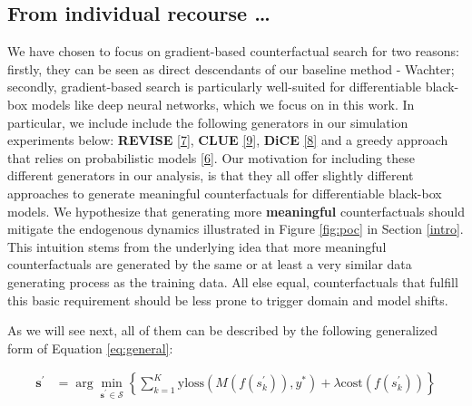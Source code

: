 \documentclass[conference,final,]{IEEEtran}
\theoremstyle{definition}
\theoremstyle{definition}
\theoremstyle{definition}
\theoremstyle{definition}
\theoremstyle{remark}
\begin{document}
\hypertarget{method-general}{%
\subsection{From individual recourse \ldots{}}\label{method-general}}

We have chosen to focus on gradient-based counterfactual search for two reasons: firstly, they can be seen as direct descendants of our baseline method - Wachter; secondly, gradient-based search is particularly well-suited for differentiable black-box models like deep neural networks, which we focus on in this work. In particular, we include include the following generators in our simulation experiments below: \textbf{REVISE} \protect\hyperlink{ref-joshi2019towards}{{[}7{]}}, \textbf{CLUE} \protect\hyperlink{ref-antoran2020getting}{{[}9{]}}, \textbf{DiCE} \protect\hyperlink{ref-mothilal2020explaining}{{[}8{]}} and a greedy approach that relies on probabilistic models \protect\hyperlink{ref-schut2021generating}{{[}6{]}}. Our motivation for including these different generators in our analysis, is that they all offer slightly different approaches to generate meaningful counterfactuals for differentiable black-box models. We hypothesize that generating more \textbf{meaningful} counterfactuals should mitigate the endogenous dynamics illustrated in Figure \ref{fig:poc} in Section \ref{intro}. This intuition stems from the underlying idea that more meaningful counterfactuals are generated by the same or at least a very similar data generating process as the training data. All else equal, counterfactuals that fulfill this basic requirement should be less prone to trigger domain and model shifts.

As we will see next, all of them can be described by the following generalized form of Equation \eqref{eq:general}:

\begin{equation}
\begin{aligned}
\mathbf{s}^\prime &= \arg \min_{\mathbf{s}^\prime \in \mathcal{S}} \left\{ \sum_{k=1}^{K} {\text{yloss}(M(f(s_k^\prime)),y^*)}+ \lambda {\text{cost}(f(s_k^\prime)) }  \right\} \label{eq:general}
\end{aligned} 
\end{equation}
\end{document}
